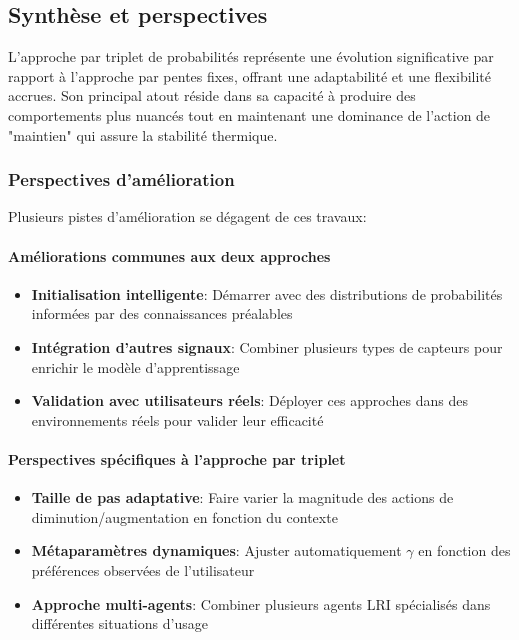\subsection{Synthèse et perspectives}

L'approche par triplet de probabilités représente une évolution significative par rapport à l'approche par pentes fixes, offrant une adaptabilité et une flexibilité accrues. Son principal atout réside dans sa capacité à produire des comportements plus nuancés tout en maintenant une dominance de l'action de "maintien" qui assure la stabilité thermique.

\subsubsection{Perspectives d'amélioration}

Plusieurs pistes d'amélioration se dégagent de ces travaux:

\paragraph{Améliorations communes aux deux approches}
\begin{itemize}
    \item \textbf{Initialisation intelligente}: Démarrer avec des distributions de probabilités informées par des connaissances préalables
    \item \textbf{Intégration d'autres signaux}: Combiner plusieurs types de capteurs pour enrichir le modèle d'apprentissage
    \item \textbf{Validation avec utilisateurs réels}: Déployer ces approches dans des environnements réels pour valider leur efficacité
\end{itemize}

\paragraph{Perspectives spécifiques à l'approche par triplet}
\begin{itemize}
    \item \textbf{Taille de pas adaptative}: Faire varier la magnitude des actions de diminution/augmentation en fonction du contexte
    \item \textbf{Métaparamètres dynamiques}: Ajuster automatiquement $\gamma$ en fonction des préférences observées de l'utilisateur
    \item \textbf{Approche multi-agents}: Combiner plusieurs agents LRI spécialisés dans différentes situations d'usage
\end{itemize}

